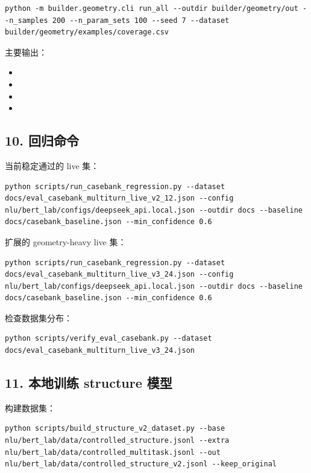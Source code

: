 \documentclass[11pt,a4paper]{ctexart}
\begin{document}
\begin{verbatim}
python -m builder.geometry.cli run_all --outdir builder/geometry/out --n_samples 200 --n_param_sets 100 --seed 7 --dataset builder/geometry/examples/coverage.csv
\end{verbatim}

主要输出：

\begin{itemize}
\item {}
\item {}
\item {}
\item {}
\end{itemize}

\subsection*{10. 回归命令}

当前稳定通过的 live 集：

\begin{verbatim}
python scripts/run_casebank_regression.py --dataset docs/eval_casebank_multiturn_live_v2_12.json --config nlu/bert_lab/configs/deepseek_api.local.json --outdir docs --baseline docs/casebank_baseline.json --min_confidence 0.6
\end{verbatim}

扩展的 geometry-heavy live 集：

\begin{verbatim}
python scripts/run_casebank_regression.py --dataset docs/eval_casebank_multiturn_live_v3_24.json --config nlu/bert_lab/configs/deepseek_api.local.json --outdir docs --baseline docs/casebank_baseline.json --min_confidence 0.6
\end{verbatim}

检查数据集分布：

\begin{verbatim}
python scripts/verify_eval_casebank.py --dataset docs/eval_casebank_multiturn_live_v3_24.json
\end{verbatim}

\subsection*{11. 本地训练 structure 模型}

构建数据集：

\begin{verbatim}
python scripts/build_structure_v2_dataset.py --base nlu/bert_lab/data/controlled_structure.jsonl --extra nlu/bert_lab/data/controlled_multitask.jsonl --out nlu/bert_lab/data/controlled_structure_v2.jsonl --keep_original
\end{verbatim}
\end{document}

